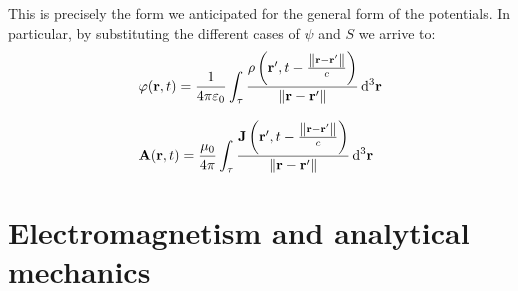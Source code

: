 This is precisely the form we anticipated for the general form of the potentials. In particular, by substituting the different cases of $\psi$ and $S$ we arrive to:
\begin{equation}
  \begin{split}
    &\varphi(\vb{r},t) = \dfrac{1}{4 \pi \varepsilon_0}\int_{\tau} \dfrac{\rho \left(\vb{r}', t-\frac{\norm{\vb{r}-\vb{r}'}}{c}\right)}{\norm{\vb{r}-\vb{r}'}}\dd{^3 \vb{r}} \\[8pt]
    &\vb{A}(\vb{r},t) = \dfrac{\mu_0}{4 \pi }\int_{\tau} \dfrac{\vb{J} \left(\vb{r}', t-\frac{\norm{\vb{r}-\vb{r}'}}{c}\right)}{\norm{\vb{r}-\vb{r}'}}\dd{^3 \vb{r}}
  \end{split}
\end{equation}
\chapter[EM and mechanics]{Electromagnetism and analytical mechanics}
